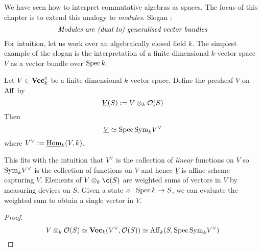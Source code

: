 \documentclass[./main.tex]{subfiles}
\begin{document}
We have seen how to interpret commutative algebras as spaces.
The focus of this chapter is to extend this analogy to \emph{modules}.
Slogan : 
\[
  \text{\emph{Modules are (dual to) generalised vector bundles}}  
\]
For intuition, let us work over an algebraically closed field $k$.
The simplest example of the slogan is
the interpretation of a finite dimensional $k$-vector space $V$
as a vector bundle over $\operatorname{Spec} k$.

\begin{prop}
  
  Let $V \in \mathbf{Vec}^c_k$ be a finite dimensional $k$-vector space.
  Define the presheaf $\underline{V}$ on $\mathrm{Aff}$ by 
  \[
    \underline{V}(S) := V \otimes_k \mathcal{O}(S)  
  \]
  Then \[
    \underline{V} \simeq \operatorname{Spec} \mathrm{Sym}_k V^\vee
  \]
  where $V^\vee := \underline{\mathrm{Hom}}_k(V , k)$.
\end{prop}
This fits with the intuition that
$V^\vee$ is the collection of \emph{linear} functions on $V$
so $\mathrm{Sym}_k V^\vee$ is the collection of functions on $V$
and hence $\underline{V}$ is affine scheme capturing $V$.
Elements of $V \otimes_k \c(S)$ are
weighted sums of vectors in $V$ by measuring devices on $S$.
Given a state $x : \operatorname{Spec} k \to S$, 
we can evaluate the weighted sum to obtain a single vector in $V$.
\begin{proof}
  \[
    V \otimes_k \mathcal{O}(S) \simeq \mathbf{Vec}_k(V^\vee , \mathcal{O}(S))
    \simeq \mathrm{Aff}_k(S , \operatorname{Spec} \mathrm{Sym}_k V^\vee)  
  \]
\end{proof}
\end{document}
